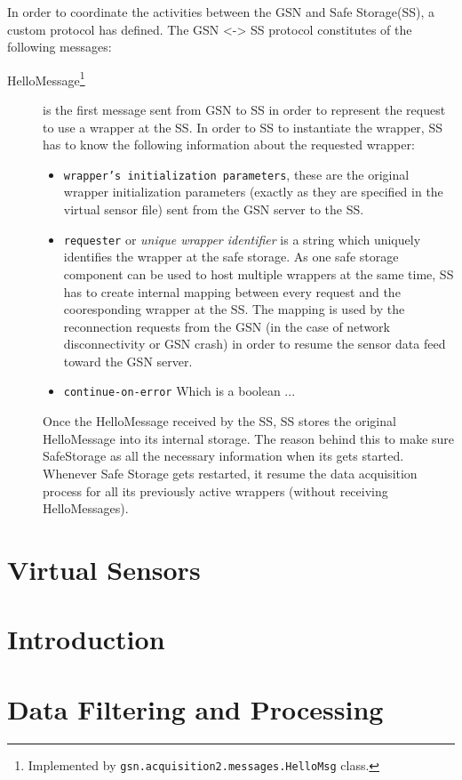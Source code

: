 In order to coordinate the activities between the GSN and Safe Storage(SS), a custom protocol has defined. The GSN <-> SS protocol 
constitutes of the following messages:
\begin{description}
	\item[HelloMessage\footnote{Implemented by \texttt{gsn.acquisition2.messages.HelloMsg} class.}] is the first message sent from GSN to SS in order to represent the request to use a wrapper at the SS. In order to SS to instantiate the wrapper, SS has to know the following
	information about the requested wrapper:
	\begin{itemize}
		\item \texttt{wrapper's initialization parameters}, these are the original wrapper initialization parameters (exactly as they are specified in the virtual sensor file) sent from the GSN server to the SS. 
		\item \texttt{requester} or \emph{unique wrapper identifier} is a string which uniquely identifies the wrapper at the safe storage. As one safe storage component can be used to host multiple wrappers at the same time, SS has to create internal mapping between every request
		and the cooresponding wrapper at the SS. The mapping is used by the reconnection requests from the GSN (in the case of network disconnectivity or GSN crash) in order to resume the sensor data feed toward the GSN server.
		\item \texttt{continue-on-error} Which is a boolean ...
	\end{itemize}
	Once the HelloMessage received by the SS, SS stores the original HelloMessage into its internal storage. The reason behind this to 
	make sure SafeStorage as all the necessary information when its gets started. Whenever Safe Storage gets restarted, it resume the
	data acquisition process for all its previously active wrappers (without receiving HelloMessages).
\end{description}

\section{Virtual Sensors}
\section{Introduction}

\section{Data Filtering and Processing}

